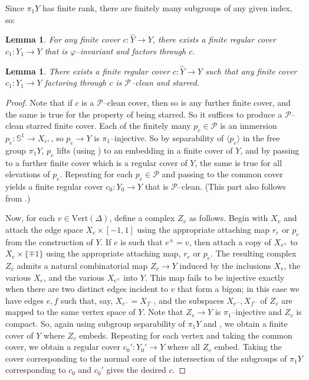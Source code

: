 \documentclass[11pt,oneside]{amsart}
\newtheorem{lem}[thm]{Lemma}
\theoremstyle{definition}
\newcommand{\vertices}{\mathrm{Vert}}
\begin{document}
Since $\pi_1Y$ has finite rank, there are finitely many subgroups of any given index, so:

\begin{lem}\label{lem:invariant-covers}
For any finite cover $c:\widehat Y\to Y$, there exists a finite regular cover $c_1:Y_1\to Y$ that is $\varphi$--invariant and factors through $c$.
\end{lem}



\begin{lem}\label{lem:finite-P-embedded-starred-cover}
There exists a finite regular cover $c:\widehat Y\to Y$ such that any finite cover $c_1:Y_1\to Y$ factoring through $c$ is $\mathcal P$--clean  and starred.
\end{lem}

\begin{proof}
Note that if $c$ is a $\mathcal P$--clean  cover, then so is any further finite cover, and the same is true for the property of being starred.  So it suffices to produce a $\mathcal P$--clean  starred finite cover.  Each of the finitely many $p_e\in\mathcal P$ is an immersion $p_e:\mathbb S^1\to X_{e^+}$, so $p_e\to Y$ is $\pi_1$--injective.  So by separability of $\langle p_e\rangle$ in the free group $\pi_1Y$, $p_e$ lifts (using \cite{Scott}) to an embedding in a finite cover of $Y$, and by passing to a further finite cover which is a regular cover of $Y$, the same is true for all elevations of $p_e$.  Repeating for each $p_e\in\mathcal P$ and passing to the common cover yields a finite regular cover $c_0:Y_0\to Y$ that is $\mathcal P$--clean.  (This part also follows from \cite{Wise:omnipotence}.) 

Now, for each $v\in\vertices(\Delta)$, define a complex $Z_v$ as follows.  Begin with $X_v$ and attach the edge space $X_{e}\times [-1,1]$ using the appropriate attaching map $r_e$ or $p_e$ from the construction of $Y$.  If $e$ is such that $e^\pm=v$, then attach a copy of $X_{e^\mp}$ to $X_e\times\{\mp1\}$ using the appropriate attaching map, $r_e$ or $p_e$.  The resulting complex $Z_v$ admits a natural combinatorial map $Z_v\to Y$ induced by the inclusions $X_v$, the various $X_e$, and the various $X_{e^{\mp}}$ into $Y$.  This map fails to be injective exactly when there are two distinct edges incident to $v$ that form a bigon; in this case we have edges $e,f$ such that, say, $X_{e^-}=X_{f^-}$, and the subspaces $X_{e^-},X_{f^-}$ of $Z_v$ are mapped to the same vertex space of $Y$.  Note that $Z_v\to Y$ is $\pi_1$--injective and $Z_v$ is compact.  So, again using subgroup separability of $\pi_1Y$ and \cite{Scott}, we obtain a finite cover of $Y$ where $Z_v$ embeds.  Repeating for each vertex and taking the common cover, we obtain a regular cover $c_0':Y_0'\to Y$ where all $Z_v$ embed.  Taking the cover corresponding to the normal core of the intersection of the subgroups of $\pi_1Y$ corresponding to $c_0$ and $c_0'$ gives the desired $c$.
\end{proof}
\end{document}
